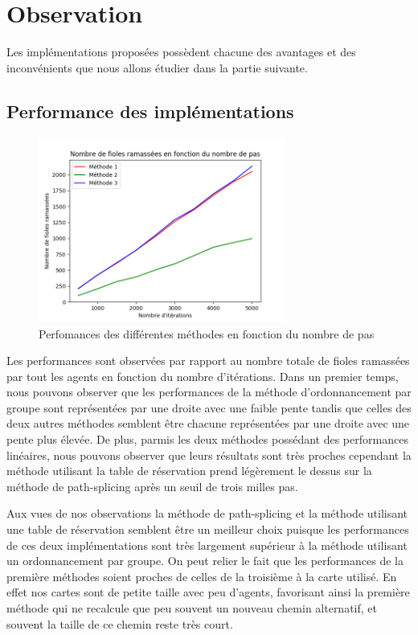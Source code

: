 \documentclass[a4paper, twocolumn]{article}
\begin{document}
		\section{Observation}
		
		Les implémentations proposées possèdent chacune des avantages et des inconvénients que nous allons étudier dans la partie suivante.
		
		\subsection{Performance des implémentations}
		
		\begin{figure}[h!]
			\includegraphics[width=3.2in]{compare_methods.png}
			\caption{\textsf{Perfomances des différentes méthodes en fonction du nombre de pas}}
			\label{fig_sim}
		\end{figure}
	
		Les performances sont observées par rapport au nombre totale de fioles ramassées par tout les agents en fonction du nombre d'itérations. Dans un premier temps, nous pouvons observer que les performances de la méthode d'ordonnancement par groupe sont représentées par une droite avec une faible pente tandis que celles des deux autres méthodes semblent être chacune représentées par une droite avec une pente plus élevée. De plus, parmis les deux méthodes possédant des performances linéaires, nous pouvons observer que leurs résultats sont très proches cependant la méthode utilisant la table de réservation prend légèrement le dessus sur la méthode de path-splicing après un seuil de trois milles pas.
		
		Aux vues de nos observations la méthode de path-splicing et la méthode utilisant une table de réservation semblent être un meilleur choix puisque les performances de ces deux implémentations sont très largement supérieur à la méthode utilisant un ordonnancement par groupe. On peut relier le fait que les performances de la première méthodes soient proches de celles de la troisième à la carte utilisé. En effet nos cartes sont de petite taille avec peu d'agents, favorisant ainsi la première méthode qui ne recalcule que peu souvent un nouveau chemin alternatif, et souvent la taille de ce chemin reste très court.
		
\end{document}
